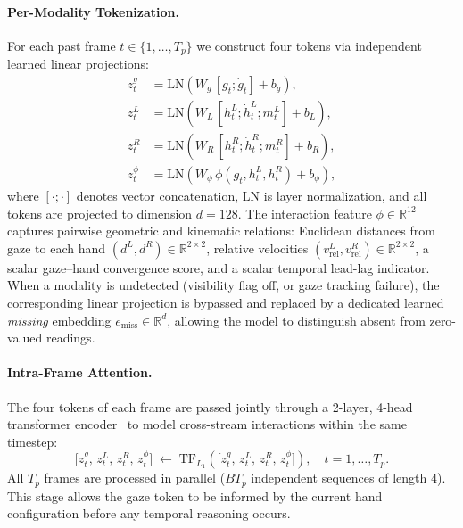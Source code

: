 \paragraph{Per-Modality Tokenization.}
\label{sec:tokenizer}
For each past frame $t \in \{1, \dots, T_p\}$ we construct four tokens
via independent learned linear projections:
\begin{align}
    z_t^{g}   &= \mathrm{LN}\!\left(W_g\,[g_t;\dot{g}_t] + b_g\right), \\
    z_t^{L}   &= \mathrm{LN}\!\left(W_L\,[h_t^L;\dot{h}_t^L;m_t^L] + b_L\right), \\
    z_t^{R}   &= \mathrm{LN}\!\left(W_R\,[h_t^R;\dot{h}_t^R;m_t^R] + b_R\right), \\
    z_t^{\phi} &= \mathrm{LN}\!\left(W_\phi\,\phi(g_t, h_t^L, h_t^R) + b_\phi\right),
\end{align}
where $[\cdot;\cdot]$ denotes vector concatenation, $\mathrm{LN}$ is layer normalization,
and all tokens are projected to dimension $d{=}128$.
The interaction feature $\phi \in \mathbb{R}^{12}$ captures pairwise geometric and
kinematic relations: Euclidean distances from gaze to each hand
$(d^L, d^R) \in \mathbb{R}^{2 \times 2}$, relative velocities
$(v^L_{\mathrm{rel}}, v^R_{\mathrm{rel}}) \in \mathbb{R}^{2 \times 2}$,
a scalar gaze--hand convergence score, and a scalar temporal lead-lag indicator.
When a modality is undetected (visibility flag off, or gaze tracking failure),
the corresponding linear projection is bypassed and replaced by a dedicated
learned \emph{missing} embedding $e_{\mathrm{miss}} \in \mathbb{R}^d$,
allowing the model to distinguish absent from zero-valued readings.

\paragraph{Intra-Frame Attention.}
The four tokens of each frame are passed jointly through a 2-layer, 4-head
transformer encoder~\cite{vaswani2017attention} to model cross-stream
interactions within the same timestep:
\begin{equation}
    \bigl[z_t^g,\, z_t^L,\, z_t^R,\, z_t^\phi\bigr]
    \;\leftarrow\;
    \mathrm{TF}_{L_1}\!\left(\bigl[z_t^g,\, z_t^L,\, z_t^R,\, z_t^\phi\bigr]\right),
    \quad t = 1,\dots,T_p.
\end{equation}
All $T_p$ frames are processed in parallel ($B T_p$ independent sequences of length 4).
This stage allows the gaze token to be informed by the current hand configuration
before any temporal reasoning occurs.

